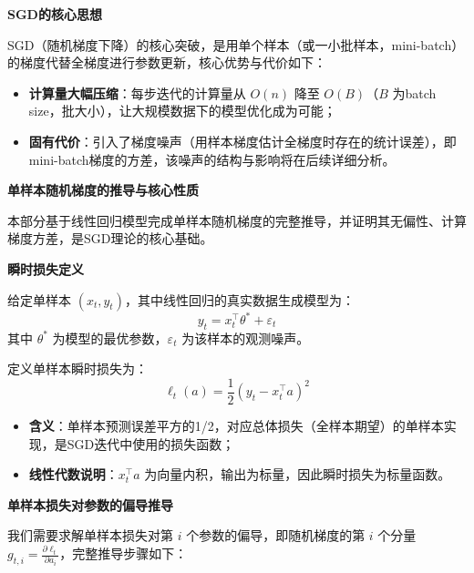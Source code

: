 \documentclass[10pt]{article}
\numberwithin{equation}{section}
\theoremstyle{plain}
\theoremstyle{definition}
\theoremstyle{remark}
\begin{document}
{\par\vspace{1ex}\noindent\large\bfseries\color{brandD} SGD的核心思想\par}\par\vspace{0.5ex}
SGD（随机梯度下降）的核心突破，是用单个样本（或一小批样本，mini-batch）的梯度代替全梯度进行参数更新，核心优势与代价如下：
\begin{itemize}[leftmargin=*,nosep]
    \item \textbf{计算量大幅压缩}：每步迭代的计算量从 $O(n)$ 降至 $O(B)$（$B$ 为batch size，批大小），让大规模数据下的模型优化成为可能；
    \item \textbf{固有代价}：引入了梯度噪声（用样本梯度估计全梯度时存在的统计误差），即mini-batch梯度的方差，该噪声的结构与影响将在后续详细分析。
\end{itemize}

{\par\vspace{1ex}\noindent\large\bfseries\color{brandD} 单样本随机梯度的推导与核心性质\par}\par\vspace{0.5ex}
本部分基于线性回归模型完成单样本随机梯度的完整推导，并证明其无偏性、计算梯度方差，是SGD理论的核心基础。

{\par\vspace{0.8ex}\noindent\normalsize\bfseries\color{secblue} 瞬时损失定义\par}
给定单样本 $(x_t, y_t)$，其中线性回归的真实数据生成模型为：
\[ \displaystyle y_t = x_t^\top \theta^* + \varepsilon_t \]
其中 $\theta^*$ 为模型的最优参数，$\varepsilon_t$ 为该样本的观测噪声。

定义单样本瞬时损失为：
\[ \displaystyle \ell_t(a) = \frac{1}{2}(y_t - x_t^\top a)^2 \tag{21} \]
\begin{itemize}[leftmargin=*,nosep]
    \item \textbf{含义}：单样本预测误差平方的1/2，对应总体损失（全样本期望）的单样本实现，是SGD迭代中使用的损失函数；
    \item \textbf{线性代数说明}：$x_t^\top a$ 为向量内积，输出为标量，因此瞬时损失为标量函数。
\end{itemize}

{\par\vspace{0.8ex}\noindent\normalsize\bfseries\color{secblue} 单样本损失对参数的偏导推导\par}
我们需要求解单样本损失对第 $i$ 个参数的偏导，即随机梯度的第 $i$ 个分量 $\displaystyle g_{t,i} = \frac{\partial \ell_t}{\partial a_i}$，完整推导步骤如下：
\end{document}
